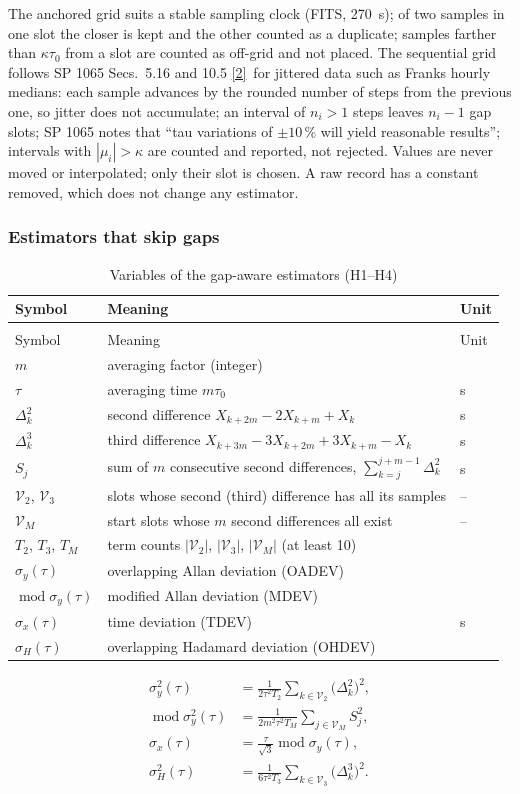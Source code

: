 \documentclass[11pt,a4paper]{article}
\makeatletter
\newcommand{\nist}{\href{https://tf.nist.gov/general/pdf/2220.pdf}{[2]}}
\renewcommand{\_}{\usscore\allowbreak}
\newenvironment{vartable}[2]{%
 \par\small\setlength{\LTpre}{3pt}\setlength{\LTpost}{3pt}%
 \begin{longtable}{@{}>{\raggedright}p{.2\linewidth}>{\raggedright}p{.57\linewidth}>{\raggedright\arraybackslash}p{.17\linewidth}@{}}
 \caption{#2}\label{#1}\\
 \toprule Symbol & Meaning & Unit\\\midrule
 \endfirsthead
 \multicolumn{3}{@{}l}{\footnotesize\itshape Table \thetable{} (continued)}\\
 \toprule Symbol & Meaning & Unit\\\midrule
 \endhead
 \bottomrule
 \endlastfoot}
 {\end{longtable}\normalsize}
\makeatother
\begin{document}
The anchored grid suits a stable sampling clock (FITS, 270~s); of two samples in one slot the closer
is kept and the other counted as a duplicate; samples farther than \(\kappa\tau_0\) from a slot are
counted as off-grid and not placed. The sequential grid follows SP 1065 Secs.~5.16 and 10.5 \nist\ for
jittered data such as Franks hourly medians: each sample advances by the rounded number of steps from the
previous one, so jitter does not accumulate; an interval of \(n_i>1\) steps leaves \(n_i-1\) gap slots;
SP 1065 notes that ``tau variations of \(\pm10\)\,\% will yield reasonable results''; intervals with
\(|\mu_i|>\kappa\) are counted and reported, not rejected. Values are never moved or interpolated; only
their slot is chosen. A raw record has a constant removed, which does not change any estimator.

\subsubsection{Estimators that skip gaps}
\begin{vartable}{tab:var-H}{Variables of the gap-aware estimators (H1--H4)}
\(m\) & averaging factor (integer) & 1\\
\(\tau\) & averaging time \(m\tau_0\) & s\\
\(\Delta^2_k\) & second difference \(X_{k+2m}-2X_{k+m}+X_k\) & s\\
\(\Delta^3_k\) & third difference \(X_{k+3m}-3X_{k+2m}+3X_{k+m}-X_k\) & s\\
\(S_j\) & sum of \(m\) consecutive second differences, \(\sum_{k=j}^{j+m-1}\Delta^2_k\) & s\\
\(\mathcal V_2\), \(\mathcal V_3\) & slots whose second (third) difference has all its samples & --\\
\(\mathcal V_M\) & start slots whose \(m\) second differences all exist & --\\
\(T_2\), \(T_3\), \(T_M\) & term counts \(|\mathcal V_2|\), \(|\mathcal V_3|\), \(|\mathcal V_M|\) (at least 10) & 1\\
\(\sigma_y(\tau)\) & overlapping Allan deviation (OADEV) & 1\\
\(\operatorname{mod}\sigma_y(\tau)\) & modified Allan deviation (MDEV) & 1\\
\(\sigma_x(\tau)\) & time deviation (TDEV) & s\\
\(\sigma_H(\tau)\) & overlapping Hadamard deviation (OHDEV) & 1\\
\end{vartable}
\begin{align}
\sigma_y^2(\tau)&=\frac{1}{2\tau^2T_2}\sum_{k\in\mathcal V_2}\bigl(\Delta^2_k\bigr)^2, \tag{H1}\label{eq:H1}\\
\operatorname{mod}\sigma_y^2(\tau)&=\frac{1}{2m^2\tau^2T_M}\sum_{j\in\mathcal V_M}S_j^2, \tag{H2}\label{eq:H2}\\
\sigma_x(\tau)&=\frac{\tau}{\sqrt3}\operatorname{mod}\sigma_y(\tau), \tag{H3}\label{eq:H3}\\
\sigma_H^2(\tau)&=\frac{1}{6\tau^2T_3}\sum_{k\in\mathcal V_3}\bigl(\Delta^3_k\bigr)^2. \tag{H4}\label{eq:H4}
\end{align}
\end{document}
